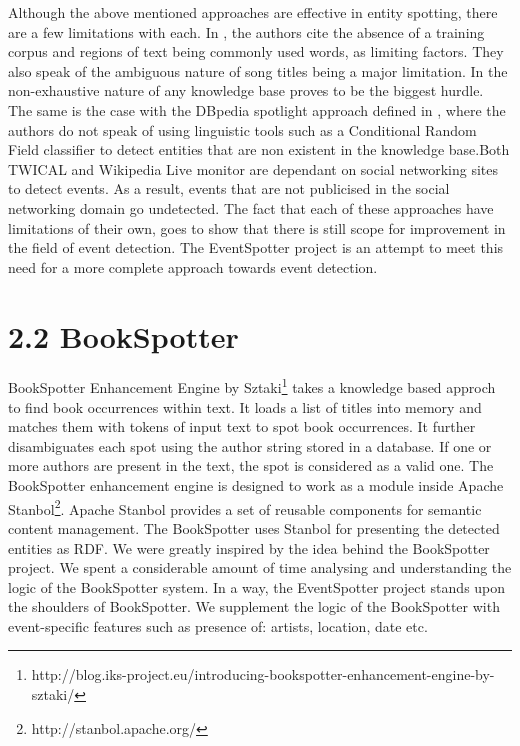\documentclass[a4paper,11pt]{report}
\begin{document}
Although the above mentioned approaches are effective in entity spotting, there are a few limitations with each. In \cite{Gruhl_contextand}, the authors cite the absence of a training corpus and regions of text being commonly used words, as limiting factors. They also speak of the ambiguous nature of song titles being a major limitation. In \cite{Hassell06ontology-drivenautomatic} the non-exhaustive nature of any knowledge base proves to be the biggest hurdle. The same is the case with the DBpedia spotlight approach defined in \cite{Mendes11dbpediaspotlight:}, where the authors do not speak of using linguistic tools such as a Conditional Random Field classifier to detect entities that are non existent in the knowledge base.Both TWICAL \cite{Ritter_opendomain} and Wikipedia Live monitor \cite{DBLP:journals/corr/abs-1303-4702} are dependant on social networking sites to detect events. As a result, events that are not publicised in the social networking domain go undetected. The fact that each of these approaches have limitations of their own, goes to show that there is still scope for improvement in the field of event detection. The EventSpotter project is an attempt to meet this need for a more complete approach towards event detection.

\section*{2.2 BookSpotter}

BookSpotter Enhancement Engine by Sztaki\footnote{http://blog.iks-project.eu/introducing-bookspotter-enhancement-engine-by-sztaki/} takes a knowledge based approch to find book occurrences within text. It loads a list of titles into memory and matches them with tokens of input text to spot book occurrences. It further disambiguates each spot using the author string stored in a database. If one or more authors are present in the text, the spot is considered as a valid one. The BookSpotter enhancement engine is designed to work as a module inside Apache Stanbol\footnote{http://stanbol.apache.org/}. Apache Stanbol provides a set of reusable components for semantic content management. The BookSpotter uses Stanbol for presenting the detected entities as RDF. We were greatly inspired by the idea behind the BookSpotter project. We spent a considerable amount of time analysing and understanding the logic of the BookSpotter system. In a way, the EventSpotter project stands upon the shoulders of BookSpotter. We supplement the logic of the BookSpotter with event-specific features such as presence of: artists, location, date etc.
\end{document}
